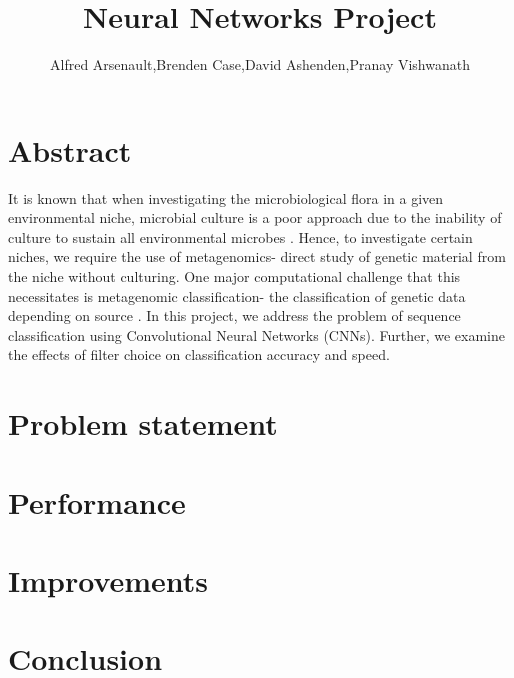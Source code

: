 \documentclass{article}
\title{Neural Networks Project}
\author{Alfred Arsenault,Brenden Case,David Ashenden,Pranay Vishwanath}
\begin{document}
\maketitle

\section{Abstract} 
It is known that when investigating the microbiological flora in a given environmental niche, microbial culture is a poor approach due to the inability of culture to sustain all environmental microbes \cite{whymeta}. Hence, to investigate certain niches, we require the use of metagenomics- direct study of genetic material from the niche without culturing. One major computational challenge that this necessitates is metagenomic classification- the classification of genetic data depending on source \cite{current}. In this project, we address the problem of sequence classification using Convolutional Neural Networks (CNNs). Further, we examine the effects of filter choice on classification accuracy and speed.\\
\pagebreak

\section{Problem statement}
\smallbreak

\section{Performance}
\smallbreak

\section{Improvements}
\smallbreak

\section{Conclusion}
\smallbreak
\end{document}
